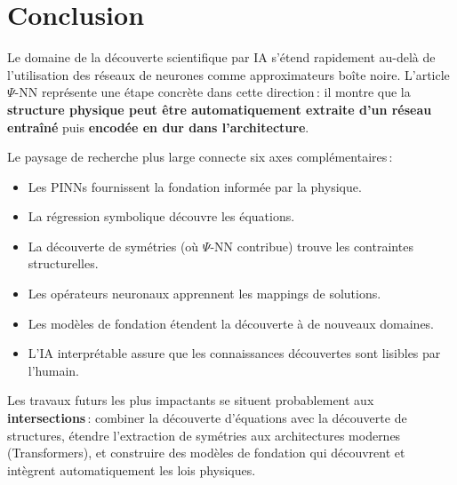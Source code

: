 \documentclass[11pt,a4paper]{article}
\begin{document}
\section{Conclusion}

Le domaine de la découverte scientifique par IA s'étend rapidement au-delà de l'utilisation des réseaux de neurones comme approximateurs boîte noire. L'article $\Psi$-NN représente une étape concrète dans cette direction\,: il montre que la \textbf{structure physique peut être automatiquement extraite d'un réseau entraîné} puis \textbf{encodée en dur dans l'architecture}.

Le paysage de recherche plus large connecte six axes complémentaires\,:
\begin{itemize}[leftmargin=1.8em,itemsep=1pt]
\item Les PINNs fournissent la fondation informée par la physique.
\item La régression symbolique découvre les équations.
\item La découverte de symétries (où $\Psi$-NN contribue) trouve les contraintes structurelles.
\item Les opérateurs neuronaux apprennent les mappings de solutions.
\item Les modèles de fondation étendent la découverte à de nouveaux domaines.
\item L'IA interprétable assure que les connaissances découvertes sont lisibles par l'humain.
\end{itemize}

Les travaux futurs les plus impactants se situent probablement aux \textbf{intersections}\,: combiner la découverte d'équations avec la découverte de structures, étendre l'extraction de symétries aux architectures modernes (Transformers), et construire des modèles de fondation qui découvrent et intègrent automatiquement les lois physiques.
\end{document}
